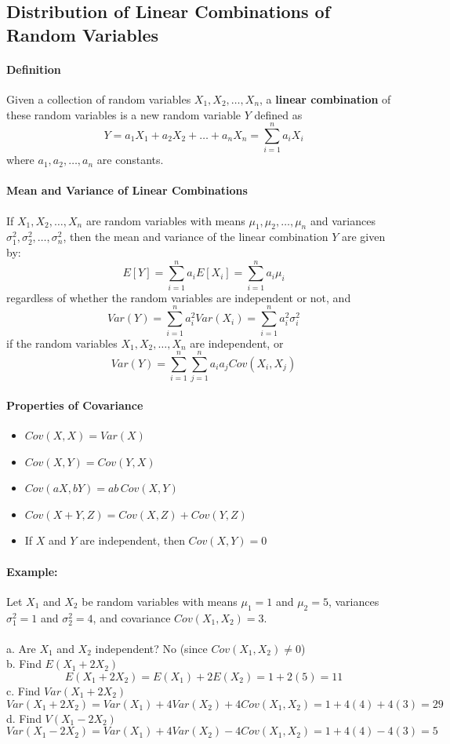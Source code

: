 \subsection{Distribution of Linear Combinations of Random Variables}

\hrulefill

\paragraph{Definition}
Given a collection of random variables \(X_1, X_2, \ldots, X_n\), a \textbf{linear combination} of these 
random variables is a new random variable \(Y\) defined as
\[
Y = a_1 X_1 + a_2 X_2 + \ldots + a_n X_n = \sum_{i=1}^n a_i X_i
\]
where \(a_1, a_2, \ldots, a_n\) are constants.

\paragraph{Mean and Variance of Linear Combinations}
If \(X_1, X_2, \ldots, X_n\) are random variables with means \(\mu_1, \mu_2, \ldots, \mu_n\) and variances 
\(\sigma_1^2, \sigma_2^2, \ldots, \sigma_n^2\), then the mean and variance of the linear combination \(Y\) are given by:
\[
E[Y] = \sum_{i=1}^n a_i E[X_i] = \sum_{i=1}^n a_i \mu_i
\]
regardless of whether the random variables are independent or not, and
\[
Var(Y) = \sum_{i=1}^n a_i^2 Var(X_i) = \sum_{i=1}^n a_i^2 \sigma_i^2
\]
if the random variables \(X_1, X_2, \ldots, X_n\) are independent, or
\[
Var(Y) = \sum_{i=1}^n \sum_{j=1}^n a_i a_j Cov(X_i, X_j)
\]

\paragraph*{Properties of Covariance}
\begin{itemize}
    \item $Cov(X, X) = Var(X)$
    \item $Cov(X, Y) = Cov(Y, X)$
    \item $Cov(aX, bY) = ab \, Cov(X, Y)$
    \item $Cov(X + Y, Z) = Cov(X, Z) + Cov(Y, Z)$
    \item If $X$ and $Y$ are independent, then $Cov(X, Y) = 0$
\end{itemize}

\paragraph*{Example:}
Let $X_1$ and $X_2$ be random variables with means $\mu_1 = 1$ and $\mu_2 = 5$, variances $\sigma_1^2 = 1$ and $\sigma_2^2 = 4$, and covariance $Cov(X_1, X_2) = 3$.\\
\\
a. Are $X_1$ and $X_2$ independent? No (since $Cov(X_1, X_2) \neq 0$)\\
b. Find $E(X_1 + 2X_2)$
\[
E(X_1 + 2X_2) = E(X_1) + 2E(X_2) = 1 + 2(5) = 11
\]
c. Find $Var(X_1 + 2X_2)$
\[
Var(X_1 + 2X_2) = Var(X_1) + 4Var(X_2) + 4Cov(X_1, X_2) = 1 + 4(4) + 4(3) = 29
\]
d. Find $V(X_1 - 2X_2)$
\[
Var(X_1 - 2X_2) = Var(X_1) + 4Var(X_2) - 4Cov(X_1, X_2) = 1 + 4(4) - 4(3) = 5
\]